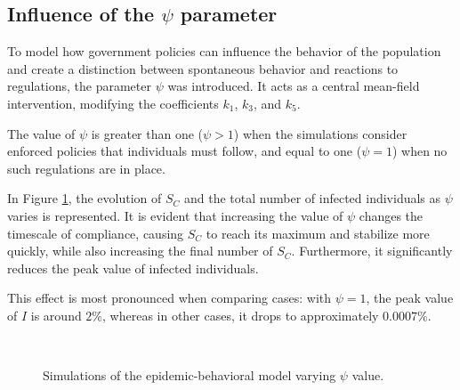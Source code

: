 \subsection{Influence of the $\psi$ parameter}
To model how government policies can influence the behavior of the population and create a distinction between spontaneous behavior and reactions to regulations, the parameter $\psi$ was introduced. It acts as a central mean-field intervention, modifying the coefficients $k_1$, $k_3$, and $k_5$.

The value of $\psi$ is greater than one ($\psi > 1$) when the simulations consider enforced policies that individuals must follow, and equal to one ($\psi = 1$) when no such regulations are in place.

In Figure \ref{fig:sim_psi}, the evolution of $S_C$ and the total number of infected individuals as $\psi$ varies is represented. It is evident that increasing the value of $\psi$ changes the timescale of compliance, causing $S_C$ to reach its maximum and stabilize more quickly, while also increasing the final number of $S_C$. Furthermore, it significantly reduces the peak value of infected individuals.

This effect is most pronounced when comparing cases: with $\psi = 1$, the peak value of $I$ is around $2\%$, whereas in other cases, it drops to approximately $0.0007\%$.
\begin{figure}[ht]
	\centering
	 \quad
	 \\
	\caption[Simulation varying $\psi$]{Simulations of the epidemic-behavioral model varying $\psi$ value.}
	\label{fig:sim_psi}
\end{figure}
